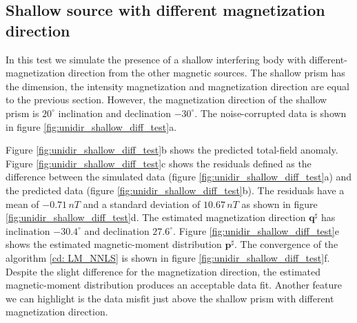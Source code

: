 \subsection{Shallow source with different magnetization direction}

In this test we simulate the presence of a shallow interfering body with different-magnetization direction from the other magnetic sources. The shallow prism has the dimension, the intensity magnetization and magnetization direction are equal to the previous section. However, the magnetization direction of the shallow prism is $20^\circ$ inclination and declination $-30^\circ$. The noise-corrupted data is shown in figure \ref{fig:unidir_shallow_diff_test}a.

Figure \ref{fig:unidir_shallow_diff_test}b shows the predicted total-field anomaly. Figure \ref{fig:unidir_shallow_diff_test}c shows the residuals defined as the difference between the simulated data (figure \ref{fig:unidir_shallow_diff_test}a) and the predicted data (figure \ref{fig:unidir_shallow_diff_test}b). The residuals have a mean of $-0.71 \, nT$ and a standard deviation of $10.67 \, nT$ as shown in figure \ref{fig:unidir_shallow_diff_test}d. The estimated magnetization direction $\mathbf{q}^\sharp$ has inclination $-30.4^\circ$ and declination $27.6^\circ$. Figure \ref{fig:unidir_shallow_diff_test}e shows the estimated magnetic-moment distribution $\mathbf{p}^\sharp$. The convergence of the algorithm \ref{cd: LM_NNLS} is shown in figure \ref{fig:unidir_shallow_diff_test}f. Despite the slight difference for the magnetization direction, the estimated magnetic-moment distribution produces an acceptable data fit. Another feature we can highlight is the data misfit just above the shallow prism with different magnetization direction.  


